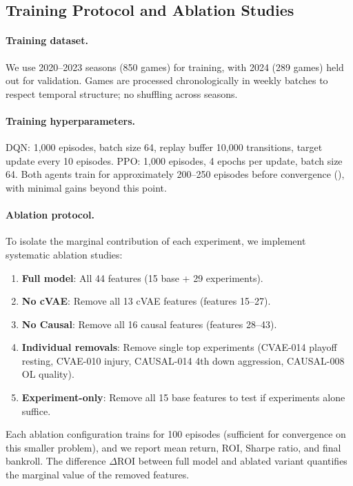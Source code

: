\subsection{Training Protocol and Ablation Studies}

\paragraph{Training dataset.}
We use 2020--2023 seasons (850 games) for training, with 2024 (289 games) held out for validation. Games are processed chronologically in weekly batches to respect temporal structure; no shuffling across seasons.

\paragraph{Training hyperparameters.}
DQN: 1,000 episodes, batch size 64, replay buffer 10,000 transitions, target update every 10 episodes. PPO: 1,000 episodes, 4 epochs per update, batch size 64. Both agents train for approximately 200--250 episodes before convergence (), with minimal gains beyond this point.

\paragraph{Ablation protocol.}
To isolate the marginal contribution of each experiment, we implement systematic ablation studies:
\begin{enumerate}
  \item \textbf{Full model}: All 44 features (15 base + 29 experiments).
  \item \textbf{No cVAE}: Remove all 13 cVAE features (features 15--27).
  \item \textbf{No Causal}: Remove all 16 causal features (features 28--43).
  \item \textbf{Individual removals}: Remove single top experiments (CVAE-014 playoff resting, CVAE-010 injury, CAUSAL-014 4th down aggression, CAUSAL-008 OL quality).
  \item \textbf{Experiment-only}: Remove all 15 base features to test if experiments alone suffice.
\end{enumerate}

Each ablation configuration trains for 100 episodes (sufficient for convergence on this smaller problem), and we report mean return, ROI, Sharpe ratio, and final bankroll. The difference $\Delta \text{ROI}$ between full model and ablated variant quantifies the marginal value of the removed features.

